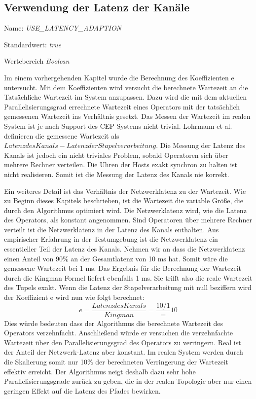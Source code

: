\subsection{Verwendung der Latenz der Kanäle}

Name: \textit{USE\_LATENCY\_ADAPTION}

Standardwert: \textit{true}

Wertebereich \textit{Boolean}

Im einem vorhergehenden Kapitel wurde die Berechnung des Koeffizienten e untersucht.
Mit dem Koeffizienten wird versucht die berechnete Wartezeit an die Tatsächliche Wartezeit im System anzupassen.
Dazu wird die mit dem aktuellen Parallelisierungsgrad errechnete Wartezeit eines Operators mit der tatsächlich gemessenen Wartezeit ins Verhältnis gesetzt.
Das Messen der Wartezeit im realen System ist je nach Support des CEP-Systems nicht trivial.
Lohrmann et al. definieren die gemessene Wartezeit als \(Latenz des Kanals - Latenz der Stapelverarbeitung\).
Die Messung der Latenz des Kanals ist jedoch ein nicht triviales Problem, sobald Operatoren sich über mehrere Rechner verteilen.
Die Uhren der Hosts exakt synchron zu halten ist nicht realisieren.
Somit ist die Messung der Latenz des Kanals nie korrekt.

Ein weiteres Detail ist das Verhältnis der Netzwerklatenz zu der Wartezeit.
Wie zu Beginn dieses Kapitels beschrieben, ist die Wartezeit die variable Größe, die durch den Algorithmus optimiert wird.
Die Netzwerklatenz wird, wie die Latenz des Operators, als konstant angenommen.
Sind Operatoren über mehrere Rechner verteilt ist die Netzwerklatenz in der Latenz des Kanals enthalten.
Aus empirischer Erfahrung in der Testumgebung ist die Netzwerklatenz ein essentieller Teil der Latenz des Kanals.
Nehmen wir an dass die Netzwerklatenz einen Anteil von 90\% an der Gesamtlatenz von 10 ms hat.
Somit wäre die gemessene Wartezeit bei 1 ms.
Das Ergebnis für die Berechnung der Wartezeit durch die Kingman Formel liefert ebenfalls 1 ms.
Sie trifft also die reale Wartezeit des Tupels exakt.
Wenn die Latenz der Stapelverarbeitung mit null beziffern wird der Koeffizient e wird nun wie folgt berechnet:
\[ e = \frac{Latenz des Kanals}{Kingman} = \frac{10 / 1} = 10\]
Dies würde bedeuten dass der Algorithmus die berechnete Wartezeit des Operators verzehnfacht.
Anschließend würde er versuchen die verzehnfachte Wartezeit über den Parallelisierungsgrad des Operators zu verringern.
Real ist der Anteil der Netzwerk-Latenz aber konstant.
Im realen System werden durch die Skalierung somit nur 10\% der berechneten Verringerung der Wartezeit effektiv erreicht.
Der Algorithmus neigt deshalb dazu sehr hohe Parallelisierungsgrade zurück zu geben, die in der realen Topologie aber nur einen geringen Effekt auf die Latenz des Pfades bewirken.

